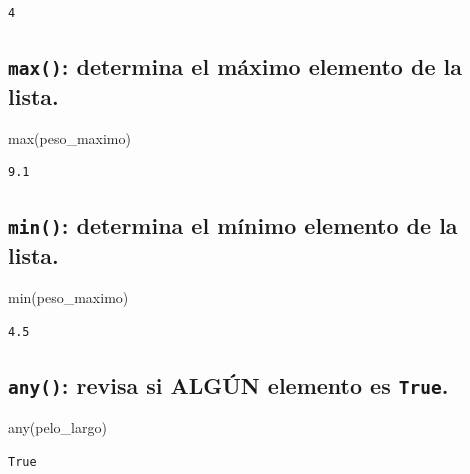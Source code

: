 \documentclass[
  spanish,
  letterpaper,
]{scrbook}
\newenvironment{Shaded}{\begin{snugshade}}{\end{snugshade}}
\newcommand{\BuiltInTok}[1]{\textcolor[rgb]{0.00,0.23,0.31}{#1}}
\newcommand{\NormalTok}[1]{\textcolor[rgb]{0.00,0.23,0.31}{#1}}
\theoremstyle{definition}
\theoremstyle{remark}
\begin{document}
\begin{verbatim}
4
\end{verbatim}

\subsection{\texorpdfstring{\texttt{max()}: determina el máximo elemento
de la
lista.}{max(): determina el máximo elemento de la lista.}}\label{max-determina-el-muxe1ximo-elemento-de-la-lista.}

\begin{Shaded}
\begin{Highlighting}[]
\BuiltInTok{max}\NormalTok{(peso\_maximo) }
\end{Highlighting}
\end{Shaded}

\begin{verbatim}
9.1
\end{verbatim}

\subsection{\texorpdfstring{\texttt{min()}: determina el mínimo elemento
de la
lista.}{min(): determina el mínimo elemento de la lista.}}\label{min-determina-el-muxednimo-elemento-de-la-lista.}

\begin{Shaded}
\begin{Highlighting}[]
\BuiltInTok{min}\NormalTok{(peso\_maximo) }
\end{Highlighting}
\end{Shaded}

\begin{verbatim}
4.5
\end{verbatim}

\subsection{\texorpdfstring{\texttt{any()}: revisa si ALGÚN elemento es
\texttt{True}.}{any(): revisa si ALGÚN elemento es True.}}\label{any-revisa-si-alguxfan-elemento-es-true.}

\begin{Shaded}
\begin{Highlighting}[]
\BuiltInTok{any}\NormalTok{(pelo\_largo) }
\end{Highlighting}
\end{Shaded}

\begin{verbatim}
True
\end{verbatim}
\end{document}
